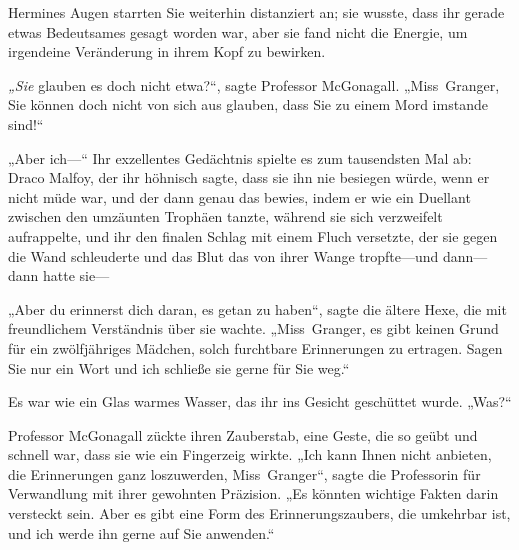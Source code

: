 Hermines Augen starrten Sie weiterhin distanziert an; sie wusste, dass ihr gerade etwas Bedeutsames gesagt worden war, aber sie fand nicht die Energie, um irgendeine Veränderung in ihrem Kopf zu bewirken.

\emph{„Sie} glauben es doch nicht etwa?“, sagte Professor McGonagall. „Miss~Granger, Sie können doch nicht von sich aus glauben, dass Sie zu einem Mord imstande sind!“

„Aber ich—“ Ihr exzellentes Gedächtnis spielte es zum tausendsten Mal ab: Draco Malfoy, der ihr höhnisch sagte, dass sie ihn nie besiegen würde, wenn er nicht müde war, und der dann genau das bewies, indem er wie ein Duellant zwischen den umzäunten Trophäen tanzte, während sie sich verzweifelt aufrappelte, und ihr den finalen Schlag mit einem Fluch versetzte, der sie gegen die Wand schleuderte und das Blut das von ihrer Wange tropfte—und dann—dann hatte sie—

„Aber du erinnerst dich daran, es getan zu haben“, sagte die ältere Hexe, die mit freundlichem Verständnis über sie wachte. „Miss~Granger, es gibt keinen Grund für ein zwölfjähriges Mädchen, solch furchtbare Erinnerungen zu ertragen. Sagen Sie nur ein Wort und ich schließe sie gerne für Sie weg.“

Es war wie ein Glas warmes Wasser, das ihr ins Gesicht geschüttet wurde.
„Was?“

Professor McGonagall zückte ihren Zauberstab, eine Geste, die so geübt und schnell war, dass sie wie ein Fingerzeig wirkte. „Ich kann Ihnen nicht anbieten, die Erinnerungen ganz loszuwerden, Miss~Granger“, sagte die Professorin für Verwandlung mit ihrer gewohnten Präzision. „Es könnten wichtige Fakten darin versteckt sein. Aber es gibt eine Form des Erinnerungszaubers, die umkehrbar ist, und ich werde ihn gerne auf Sie anwenden.“

